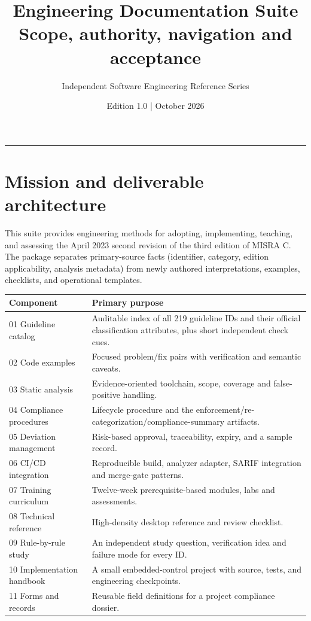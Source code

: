\documentclass[10pt,letterpaper]{article}
\title{\vspace{-2.3em}\color{DeepNavy}\Huge\bfseries Engineering Documentation Suite\\[0.45em]\large\normalfont\color{Teal} Scope, authority, navigation and acceptance}
\author{Independent Software Engineering Reference Series}
\date{Edition 1.0 \quad | \quad October 2026}
\begin{document}
\maketitle
\vspace{-0.4em}
\begin{center}\color{Slate}\rule{0.83\linewidth}{0.4pt}\end{center}
\DocNotes
\tableofcontents
\newpage

\section{Mission and deliverable architecture}
This suite provides engineering methods for adopting, implementing, teaching, and assessing the April 2023 second revision of the third edition of MISRA C. The package separates primary-source facts (identifier, category, edition applicability, analysis metadata) from newly authored interpretations, examples, checklists, and operational templates.
\begin{tabularx}{\linewidth}{@{}lX@{}}\toprule
\textbf{Component} & \textbf{Primary purpose}\\\midrule
01 Guideline catalog & Auditable index of all 219 guideline IDs and their official classification attributes, plus short independent check cues.\\
02 Code examples & Focused problem/fix pairs with verification and semantic caveats.\\
03 Static analysis & Evidence-oriented toolchain, scope, coverage and false-positive handling.\\
04 Compliance procedures & Lifecycle procedure and the enforcement/re-categorization/compliance-summary artifacts.\\
05 Deviation management & Risk-based approval, traceability, expiry, and a sample record.\\
06 CI/CD integration & Reproducible build, analyzer adapter, SARIF integration and merge-gate patterns.\\
07 Training curriculum & Twelve-week prerequisite-based modules, labs and assessments.\\
08 Technical reference & High-density desktop reference and review checklist.\\
09 Rule-by-rule study & An independent study question, verification idea and failure mode for every ID.\\
10 Implementation handbook & A small embedded-control project with source, tests, and engineering checkpoints.\\
11 Forms and records & Reusable field definitions for a project compliance dossier.\\\bottomrule
\end{tabularx}
\end{document}
